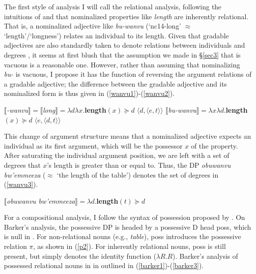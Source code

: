 \documentclass[output=paper,
modfonts
]{langscibook}
\begin{document}
The first style of analysis I will call the {\sc relational analysis}, following the intuitions of \citet{moltmann09degree} and \citet{nicolas04semantics} that nominalized properties like {\it length} are inherently relational. That is, a nominalized adjective like {\it bu-wanvu} (`{\sc nc14}-long' $\approx$ `length'/`longness') relates an individual to its length. Given that gradable adjectives are also standardly taken to denote relations between individuals and degrees \citep{cresswell76semantics, heim01degree, kennedy05scale}, it seems at first blush that the assumption we made in \S\ref{sec3} that  is vacuous is a reasonable one. However, rather than assuming that nominalizing {\it bu-} is vacuous, I propose it has the function of reversing the argument relations of a gradable adjective; the difference between the gradable adjective and its nominalized form is thus given in (\ref{wanvu1})-(\ref{wanvu2}).


\begin{exe}
\ex\label{wanvu1} 
$\llbracket${\it-wanvu}$\rrbracket = \llbracket${\it long}$\rrbracket = \lambda d\lambda x.${\bf length}$(x)\succeq d$ \hfill $\langle d, \langle e, t\rangle\rangle$
\ex\label{wanvu2} 
$\llbracket${\it bu-wanvu}$\rrbracket = \lambda x\lambda d.${\bf length}$(x)\succeq d$ \hfill $\langle e, \langle d, t\rangle\rangle$

\end{exe}


This change of argument structure means that a nominalized adjective expects an individual as its first argument, which will be the possessor $x$ of the property. After saturating the individual argument position, we are left with a set of degrees that $x$'s length is greater than or equal to.  Thus, the DP {\it obuwanvu bw'emmeeza} ($\approx$ `the length of the table') denotes the set of degrees in (\ref{wanvu3}).


\begin{exe}
\ex\label{wanvu3}
$\llbracket${\it obuwanvu bw'emmeeza}$\rrbracket = \lambda d.${\bf length}$(t) \succeq d$
\end{exe}


For a compositional analysis, I follow the syntax of possession proposed by \citet{barker95possessive}. On Barker's analysis, the possessive DP is headed by a possessive D head {\sc poss}, which is null in . For non-relational nouns (e.g., {\it table}), {\sc poss} introduces the possessive relation $\pi$, as shown in (\ref{p2}). For inherently relational nouns, {\sc poss} is still present, but simply denotes the identity function ($\lambda R.R$). Barker's analysis of possessed relational nouns in  in outlined in (\ref{barker1})-(\ref{barker3}).
\end{document}

